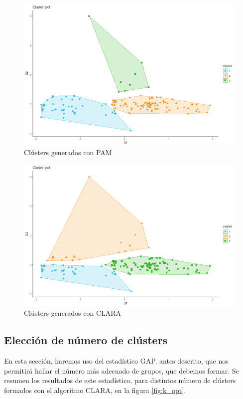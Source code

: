 \documentclass[12pt,oneside]{book}\usepackage[]{graphicx}\usepackage[]{color}
\theoremstyle{definition} %
\begin{document}
\begin{figure}[H]
\centering
\includegraphics[scale=0.45]{Resultados/1_Pamk3}
\caption{Clústers generados con PAM}\label{fig:pam}
\end{figure}


\begin{figure}[H]
\centering
\includegraphics[scale=0.45]{Resultados/1_Clarak3}
\caption{Clústers generados con CLARA }\label{fig:clara}
\end{figure}




\subsection{Elección de número de clústers}
En esta sección, haremos uso del estadístico GAP, antes descrito, que nos permitirá hallar el número más adecuado de grupos, que debemos formar. Se resumen los resultados de este estadístico, para distintos número de clústers formados con el algoritmo CLARA, en la figura \ref{fig:k_opt}.
\end{document}
